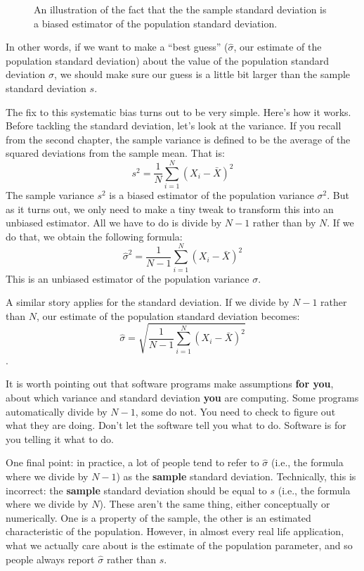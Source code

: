\documentclass[
  letterpaper,
  DIV=11,
  numbers=noendperiod]{scrreprt}
\begin{document}
\begin{figure}


\caption{\label{fig-estimatorbiasB}An illustration of the fact that the
the sample standard deviation is a biased estimator of the population
standard deviation.}

\end{figure}%

In other words, if we want to make a ``best guess'' (\(\hat\sigma\), our
estimate of the population standard deviation) about the value of the
population standard deviation \(\sigma\), we should make sure our guess
is a little bit larger than the sample standard deviation \(s\).

The fix to this systematic bias turns out to be very simple. Here's how
it works. Before tackling the standard deviation, let's look at the
variance. If you recall from the second chapter, the sample variance is
defined to be the average of the squared deviations from the sample
mean. That is: \[s^2 = \frac{1}{N} \sum_{i=1}^N (X_i - \bar{X})^2\] The
sample variance \(s^2\) is a biased estimator of the population variance
\(\sigma^2\). But as it turns out, we only need to make a tiny tweak to
transform this into an unbiased estimator. All we have to do is divide
by \(N-1\) rather than by \(N\). If we do that, we obtain the following
formula: \[\hat\sigma^2 = \frac{1}{N-1} \sum_{i=1}^N (X_i - \bar{X})^2\]
This is an unbiased estimator of the population variance \(\sigma\).

A similar story applies for the standard deviation. If we divide by
\(N-1\) rather than \(N\), our estimate of the population standard
deviation becomes:
\[\hat\sigma = \sqrt{\frac{1}{N-1} \sum_{i=1}^N (X_i - \bar{X})^2}\].

It is worth pointing out that software programs make assumptions
\textbf{for you}, about which variance and standard deviation
\textbf{you} are computing. Some programs automatically divide by
\(N-1\), some do not. You need to check to figure out what they are
doing. Don't let the software tell you what to do. Software is for you
telling it what to do.

One final point: in practice, a lot of people tend to refer to
\(\hat{\sigma}\) (i.e., the formula where we divide by \(N-1\)) as the
\textbf{sample} standard deviation. Technically, this is incorrect: the
\textbf{sample} standard deviation should be equal to \(s\) (i.e., the
formula where we divide by \(N\)). These aren't the same thing, either
conceptually or numerically. One is a property of the sample, the other
is an estimated characteristic of the population. However, in almost
every real life application, what we actually care about is the estimate
of the population parameter, and so people always report \(\hat\sigma\)
rather than \(s\).
\end{document}
